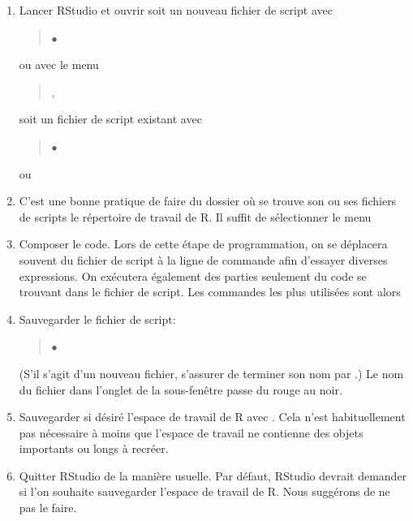 \begin{enumerate}
\item Lancer RStudio et ouvrir soit un nouveau fichier de script avec
  \begin{quote}
     $\bullet$ 
  \end{quote}
  ou avec le menu
  \begin{quote}
    ,
  \end{quote}
  soit un fichier de script existant avec
  \begin{quote}
     $\bullet$ 
  \end{quote}
  ou
  \begin{quote}
  \end{quote}
\item C'est une bonne pratique de faire du dossier où se trouve son ou
  ses fichiers de scripts le répertoire de travail de R. Il suffit de
  sélectionner le menu
  \begin{quote}
  \end{quote}
\item Composer le code. Lors de cette étape de programmation, on se
  déplacera souvent du fichier de script à la ligne de commande afin
  d'essayer diverses expressions. On exécutera également des parties
  seulement du code se trouvant dans le fichier de script. Les
  commandes les plus utilisées sont alors
  \begin{quote}
  \end{quote}
\item Sauvegarder le fichier de script:
  \begin{quote}
     $\bullet$ 
  \end{quote}
  (S'il s'agit d'un nouveau fichier, s'assurer de terminer son nom par
  .) Le nom du fichier dans l'onglet de la sous-fenêtre passe
  du rouge au noir.
\item Sauvegarder si désiré l'espace de travail de R avec
  . Cela n'est
  habituellement pas nécessaire à moins que l'espace de travail ne
  contienne des objets importants ou longs à recréer.
\item Quitter RStudio de la manière usuelle. Par défaut, RStudio
  devrait demander si l'on souhaite sauvegarder l'espace de travail de
  R. Nous suggérons de ne pas le faire.


\end{enumerate}
